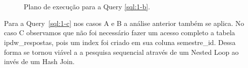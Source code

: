\documentclass[a4paper,12pt]{article}
\begin{document}
\begin{figure}[hpt]
   \begin{center}
      \\
      \\
   \end{center}
   \caption{Plano de execução para a Query \ref{sql:1-b}.}
   \label{fig:plano_1-b}
\end{figure}

Para a Query~\ref{sql:1-c} nos casos A e B a análise anterior também se aplica.
No caso C observamos que não foi necessário fazer um acesso completo a tabela ipdw\_respostas,
pois um index foi criado em sua coluna semestre\_id. Dessa forma se tornou viável a
a pesquisa sequencial através de um Nested Loop ao invés de um Hash Join.

\begin{program}
   
   \caption{Questão 1-c.}
   \label{sql:1-c}
\end{program}
\end{document}

